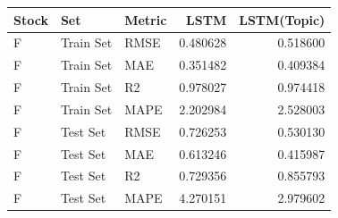 \begin{tabular}{lllrr}
\toprule
Stock & Set & Metric & LSTM & LSTM(Topic) \\
\midrule
F & Train Set & RMSE & 0.480628 & 0.518600 \\
F & Train Set & MAE & 0.351482 & 0.409384 \\
F & Train Set & R2 & 0.978027 & 0.974418 \\
F & Train Set & MAPE & 2.202984 & 2.528003 \\
F & Test Set & RMSE & 0.726253 & 0.530130 \\
F & Test Set & MAE & 0.613246 & 0.415987 \\
F & Test Set & R2 & 0.729356 & 0.855793 \\
F & Test Set & MAPE & 4.270151 & 2.979602 \\
\bottomrule
\end{tabular}
